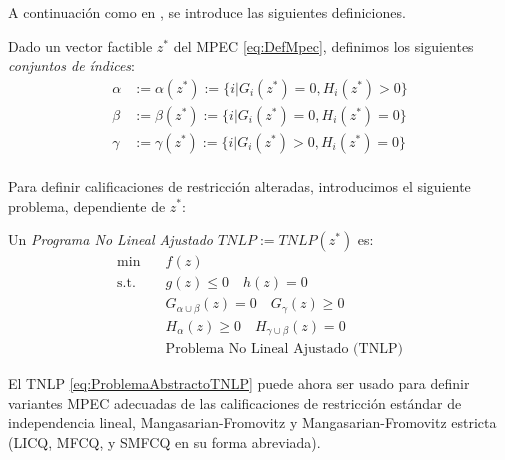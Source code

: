 
A continuación como en \cite{Flegel2003AFJ}, se introduce las siguientes definiciones.
\begin{definition}
Dado un vector factible $z^*$ del MPEC \eqref{eq:DefMpec}, definimos los siguientes \textit{conjuntos de índices}:
\begin{equation}
\begin{aligned}
\alpha &:= \alpha(z^*) := \{i|G_i(z^*) = 0, H_i(z^*) > 0\} \\
\beta &:= \beta(z^*) := \{i|G_i(z^*) = 0, H_i(z^*) = 0\}  \\
\gamma &:= \gamma(z^*) := \{i|G_i(z^*) > 0, H_i(z^*) = 0\}  \\
\end{aligned}
\label{eq:ConjuntoDeIndices} 
\end{equation}
\end{definition}

Para definir calificaciones de restricción alteradas, introducimos el siguiente problema, dependiente de $z^*$:

\begin{definition}

Un \textit{Programa No Lineal Ajustado $TNLP := TNLP(z^*)$} es:
\begin{equation}
\begin{aligned} 
\min \quad & f(z) \\
\text{s.t.} \quad & g(z) \leq 0 \quad h(z) = 0  \\
& G_{\alpha \cup \beta}(z) = 0 \quad G_{\gamma}(z) \geq 0  \\
& H_{\alpha}(z) \geq 0 \quad H_{\gamma \cup \beta}(z) = 0  \\
& \text{Problema No Lineal Ajustado (TNLP)}  
\end{aligned}
\label{eq:ProblemaAbstractoTNLP}
\end{equation}
    
\end{definition}

El TNLP \eqref{eq:ProblemaAbstractoTNLP} puede ahora ser usado para definir variantes MPEC adecuadas de las calificaciones de restricción estándar de independencia lineal, Mangasarian-Fromovitz y Mangasarian-Fromovitz estricta (LICQ, MFCQ, y SMFCQ en su forma abreviada).

